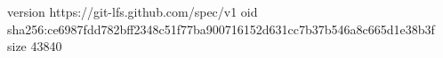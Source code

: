 version https://git-lfs.github.com/spec/v1
oid sha256:ce6987fdd782bff2348c51f77ba900716152d631cc7b37b546a8c665d1e38b3f
size 43840
